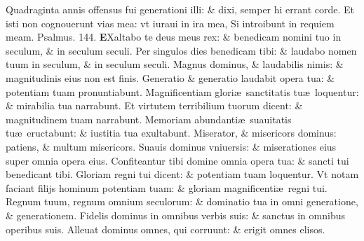 \documentclass[a5paper,10pt]{book}
\def\ae{æ}
\begin{document}
\begin{multicols*}{2}
\newline \color{red} Q\color{black}uadraginta annis offensus fui generationi illi: \& dixi, semper hi errant corde.
\newline \color{red} E\color{black}t isti non cognouerunt vias mea: vt iuraui in ira mea, Si introibunt in requiem meam.%
\quad \color{red} Psalmus. \hypertarget{ps144}{144.}\color{black}
\lettrine[lines=2]{\bfseries \color{red} E}{}Xaltabo te deus meus rex: \& benedicam nomini tuo in seculum, \& in seculum seculi.
\newline \color{red} P\color{black}er singulos dies benedicam tibi: \& laudabo nomen tuum in seculum, \& in seculum seculi.
\newline \color{red} M\color{black}agnus dominus, \& laudabilis nimis: \& magnitudinis eius non est finis.
\newline \color{red} G\color{black}eneratio \& generatio laudabit opera tua: \& potentiam tuam pronuntiabunt.
\newline \color{red} M\color{black}agnificentiam glori\ae \ sanctitatis tu\ae \ loquentur: \& mirabilia tua narrabunt.
\newline \color{red} E\color{black}t virtutem terribilium tuorum dicent: \& magnitudinem tuam narrabunt.
\newline \color{red} M\color{black}emoriam abundanti\ae \ suauitatis tu\ae \ eructabunt: \& iustitia tua exultabunt.
\newline \color{red} M\color{black}iserator, \& misericors dominus: patiens, \& multum misericors.
\newline \color{red} S\color{black}uauis dominus vniuersis: \& miserationes eius super omnia opera eius.
\newline \color{red} C\color{black}onfiteantur tibi domine omnia opera tua: \& sancti tui benedicant tibi.
\newline \color{red} G\color{black}loriam regni tui dicent: \& potentiam tuam loquentur.
\newline \color{red} V\color{black}t notam faciant filijs hominum potentiam tuam: \& gloriam magnificenti\ae \ regni tui.
\newline \color{red} R\color{black}egnum tuum, regnum omnium seculorum: \& dominatio tua in omni generatione, \& generationem.
\newline \color{red} F\color{black}idelis dominus in omnibus verbis suis: \& sanctus in omnibus operibus suis.
\newline \color{red} A\color{black}lleuat dominus omnes, qui corruunt: \& erigit omnes elisos.

\end{multicols*}
\end{document}

